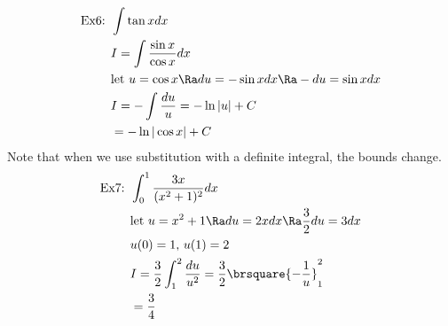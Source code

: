\begin{align*}
    \text{Ex6: }&\int\tan xdx\\
    &I=\int\frac{\sin x}{\cos x}dx\\
    &\text{let }u=\cos x\Ra du=-\sin xdx\Ra -du=\sin xdx\\
    &I=-\int\frac{du}{u}=-\ln|u|+C\\
    &=-\ln|\cos x|+C
\end{align*}
Note that when we use substitution with a definite integral, the bounds change.
\begin{align*}
    \text{Ex7: }&\int_0^1\frac{3x}{(x^2+1)^2}dx\\
    &\text{let }u=x^2+1\Ra du=2xdx\Ra \frac{3}{2}du=3dx\\
    &u(0)=1,\,u(1)=2\\
    &I=\frac{3}{2}\int_1^2\frac{du}{u^2}=\frac{3}{2}\brsquare{-\frac{1}{u}}^2_1\\
    &=\frac{3}{4}
\end{align*}

